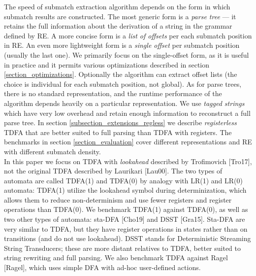 \documentclass[]{article}
\begin{document}
The speed of submatch extraction algorithm depends on the form in which submatch results are constructed.
The most generic form is a \emph{parse tree} --- it retains the full information about the derivation of a string in the grammar defined by RE.
A more concise form is a \emph{list of offsets} per each submatch position in RE.
An even more lightweight form is a \emph{single offset} per submatch position (usually the last one).
%
We primarily focus on the single-offset form,
as it is useful in practice %
and it permits various optimizations described in section \ref{section_optimizations}.
Optionally the algorithm can extract offset lists (the choice is individual for each submatch position, not global).
%
As for parse trees, there is no standard representation, and the runtime performance of the algorithm depends heavily on a particular representation.
We use \emph{tagged strings} which have very low overhead and retain enough information to reconstruct a full parse tree.
In section \ref{subsection_extensions_regless} we describe \emph{registerless} TDFA
that are better suited to full parsing than TDFA with registers.
The benchmarks in section \ref{section_evaluation} cover different representations and RE with different submatch density.
\\

In this paper we focus on TDFA with \emph{lookahead} described by Trofimovich [Tro17], not the original TDFA described by Laurikari [Lau00].
The two types of automata are called TDFA(1) and TDFA(0) by analogy with LR(1) and LR(0) automata:
TDFA(1) utilize the lookahead symbol during determinization, which allows them to reduce non-determinism and use fewer registers and register operations than TDFA(0).
We benchmark TDFA(1) against TDFA(0), as well as two other types of automata: sta-DFA [Cho19] and DSST [Gra15].
Sta-DFA are very similar to TDFA, but they have register operations in states rather than on transitions (and do not use lookahead).
DSST stands for Deterministic Streaming String Transducers; these are more distant relatives to TDFA,
better suited to string rewriting and full parsing.
We also benchmark TDFA against Ragel [Ragel], which uses simple DFA with ad-hoc user-defined actions.
\\
\end{document}

